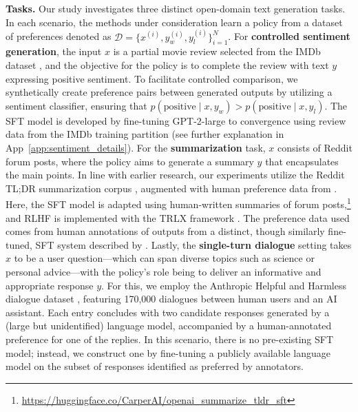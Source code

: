 \textbf{Tasks.} Our study investigates three distinct open-domain text generation tasks. In each scenario, the methods under consideration learn a policy from a dataset of preferences denoted as $\mathcal{D}=\bigl\{x^{(i)}, y_w^{(i)}, y_l^{(i)}\bigr\}_{i=1}^N$. For \textbf{controlled sentiment generation}, the input $x$ is a partial movie review selected from the IMDb dataset \cite{maas-EtAl:2011:ACL-HLT2011}, and the objective for the policy is to complete the review with text $y$ expressing positive sentiment. To facilitate controlled comparison, we synthetically create preference pairs between generated outputs by utilizing a sentiment classifier, ensuring that $p(\text{positive}\mid x,y_w)>p(\text{positive}\mid x,y_l)$. The SFT model is developed by fine-tuning GPT-2-large to convergence using review data from the IMDb training partition (see further explanation in App~\ref{app:sentiment_details}). For the \textbf{summarization} task, $x$ consists of Reddit forum posts, where the policy aims to generate a summary $y$ that encapsulates the main points. In line with earlier research, our experiments utilize the Reddit TL;DR summarization corpus \citep{volske-etal-2017-tl}, augmented with human preference data from \citeauthor{stiennon2022learning}. Here, the SFT model is adapted using human-written summaries of forum posts,\footnote{\url{https://huggingface.co/CarperAI/openai_summarize_tldr_sft}} and RLHF is implemented with the TRLX framework \citep{leandro_von_werra_2023_7790115}. The preference data used comes from human annotations of outputs from a distinct, though similarly fine-tuned, SFT system described by \citeauthor{stiennon2022learning}. Lastly, the \textbf{single-turn dialogue} setting takes $x$ to be a user question—which can span diverse topics such as science or personal advice—with the policy's role being to deliver an informative and appropriate response $y$. For this, we employ the Anthropic Helpful and Harmless dialogue dataset \citep{bai2022training}, featuring 170,000 dialogues between human users and an AI assistant. Each entry concludes with two candidate responses generated by a (large but unidentified) language model, accompanied by a human-annotated preference for one of the replies. In this scenario, there is no pre-existing SFT model; instead, we construct one by fine-tuning a publicly available language model on the subset of responses identified as preferred by annotators.

